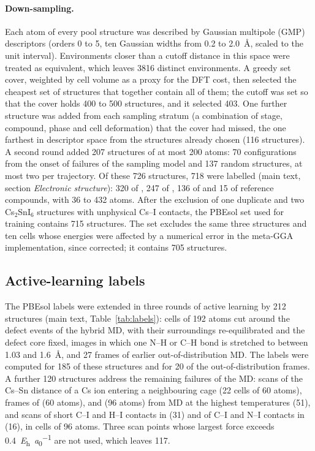 \paragraph{Down-sampling.}
Each atom of every pool structure was described by Gaussian multipole (GMP) descriptors\cite{Lei2019GMP, Lei2022GMP} (orders 0 to 5, ten Gaussian widths from 0.2 to \SI{2.0}{\angstrom}, scaled to the
unit interval). Environments closer than a cutoff distance in this space were treated as
equivalent, which leaves 3816 distinct environments. A greedy set cover, weighted by cell volume
as a proxy for the DFT cost, then selected the cheapest set of structures that together contain
all of them; the cutoff was set so that the cover holds 400 to 500 structures, and it selected
403. One further structure was added from each sampling stratum (a combination of stage,
compound, phase and cell deformation) that the cover had missed, the one farthest in descriptor
space from the structures already chosen (116 structures). A second round added 207 structures
of at most 200 atoms: 70 configurations from the onset of failures of the sampling model and
137 random structures, at most two per trajectory. Of these 726 structures, 718 were labelled
(main text, section \emph{Electronic structure}): 320 of \MASnI{}, 247 of \FASnI{}, 136 of \CsSnI{} and 15
of reference compounds, with 36 to 432 atoms. After the exclusion of one duplicate and two
Cs$_2$SnI$_6$ structures with unphysical Cs--I contacts, the PBEsol set used for training contains
715 structures. The \rSCAN{} set excludes the same three structures and ten \CsSnI{} cells whose
\rSCAN{} energies were affected by a numerical error in the meta-GGA implementation, since
corrected; it contains 705 structures.

\subsection{Active-learning labels}
\label{sec:configgen:al}
{\changedcolor
The PBEsol labels were extended in three rounds of active learning by 212 structures (main text,
Table~\ref{tab:labels}): cells of 192 atoms cut around the defect events of the hybrid MD, with their surroundings
re-equilibrated and the defect core fixed, images in which one N--H or C--H bond is stretched to between 1.03 and
\SI{1.6}{\angstrom}, and 27 frames of earlier out-of-distribution MD. The \rSCAN{} labels were computed for 185 of these
structures and for 20 of the out-of-distribution frames. A further 120 \rSCAN{} structures address the remaining
failures of the \rSCAN{} MD: scans of the Cs--Sn distance of a Cs ion entering a neighbouring cage (22 cells of 60
atoms), frames of \CsSnI{} (60 atoms), \MASnI{} and \FASnI{} (96 atoms) from MD at the highest temperatures (51), and
scans of short C--I and H--I contacts in \FASnI{} (31) and of C--I and N--I contacts in \MASnI{} (16), in cells of 96
atoms. Three \FASnI{} scan points whose largest force exceeds \SI{0.4}{\hartree\per\bohr} are not used, which leaves 117.
}

